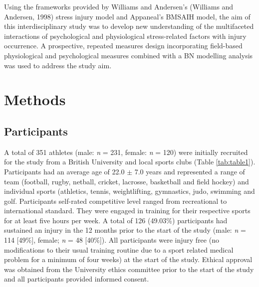 \documentclass[
  english,
  man]{apa6}
\begin{document}
Using the frameworks provided by Williams and Andersen's (Williams and Andersen, 1998) stress injury model and Appaneal's BMSAIH model, the aim of this interdisciplinary study was to develop new understanding of the multifaceted interactions of psychological and physiological stress-related factors with injury occurrence. A prospective, repeated measures design incorporating field-based physiological and psychological measures combined with a BN modelling analysis was used to address the study aim.

\section{Methods}

\subsection{Participants}

A total of 351 athletes (male: \emph{n} = 231, female: \emph{n} = 120) were initially recruited for the study from a British University and local sports clubs (Table \ref{tab:table1}). Participants had an average age of 22.0 \(\pm\) 7.0 years and represented a range of team (football, rugby, netball, cricket, lacrosse, basketball and field hockey) and individual sports (athletics, tennis, weightlifting, gymnastics, judo, swimming and golf.
Participants self-rated competitive level ranged from recreational to international standard.
They were engaged in training for their respective sports for at least five hours per week.
A total of 126 (49.03\%) participants had sustained an injury in the 12 months prior to the start of the study (male: \emph{n} = 114 {[}49\%{]}, female; \emph{n} = 48 {[}40\%{]}).
All participants were injury free (no modifications to their usual training routine due to a sport related medical problem for a minimum of four weeks) at the start of the study.
Ethical approval was obtained from the University ethics committee prior to the start of the study and all participants provided informed consent.
\end{document}
